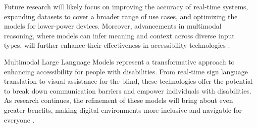 Future research will likely focus on improving the accuracy of real-time systems, expanding datasets to cover a broader range of use cases, and optimizing the models for lower-power devices. Moreover, advancements in multimodal reasoning, where models can infer meaning and context across diverse input types, will further enhance their effectiveness in accessibility technologies \cite{vs2023chen}.


Multimodal Large Language Models represent a transformative approach to enhancing accessibility for people with disabilities. From real-time sign language translation to visual assistance for the blind, these technologies offer the potential to break down communication barriers and empower individuals with disabilities. As research continues, the refinement of these models will bring about even greater benefits, making digital environments more inclusive and navigable for everyone \cite{yang2024viassist,vs2024song,vs2024li}.





